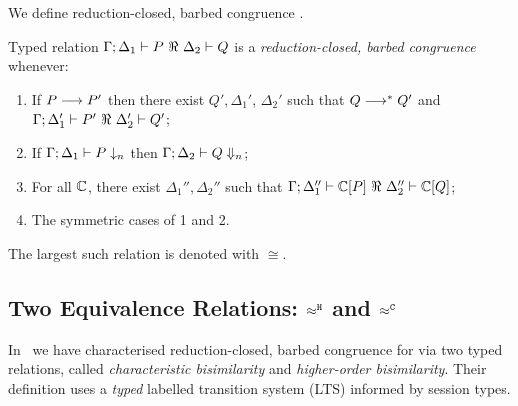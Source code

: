 \documentclass[runningheads]{llncs}
\begin{document}
{%

We define reduction-closed, barbed congruence \cite{HondaKYoshida95}. 


\begin{definition}
\label{def:rc}
	Typed relation
	$\horel{\Gamma}{\Delta_1}{P}{\ \Re\ }{\Delta_2}{Q}$
	is a {\em reduction-closed, barbed congruence} whenever:
	\begin{enumerate}[1.]
		\item	If $P \longrightarrow P'$ then there exist $Q', \Delta_1'$,  $\Delta_2'$ such that $Q \longrightarrow^* Q'$ and
			$\horel{\Gamma}{\Delta_1'}{P'}{\ \Re\ }{\Delta_2'}{Q'}$; 

			\item	If $\Gamma;\Delta_1 \vdash P \downarrow_{n}$ then $\Gamma;\Delta_2 \vdash Q \Downarrow_{n}$; %


		\item	For all ${\mathbb{C}}$, there exist $\Delta_1'',\Delta_2''$ such that  $\horel{\Gamma}{\Delta_1''}{\context{\C}{P}}{\ \Re\ }{\Delta_2''}{\context{\C}{Q}}$;
		                      \item	The symmetric cases of 1 and 2.                
	\end{enumerate}
	The largest such relation is denoted with $\cong$.
\end{definition}

{
\subsection{Two Equivalence Relations: $\approx^\mathtt{H}$ and $\approx^\mathtt{C}$}\label{ss:equiv}
In~\cite{characteristic_bis,KouzapasPY17} we have characterised
reduction-closed, barbed congruence for \HOp
via two typed relations, called
{\em characteristic bisimilarity}
and 
\emph{higher-order bisimilarity}.
Their definition 
uses a \emph{typed}
labelled transition system (LTS) informed by session
types. 

}}
\end{document}
